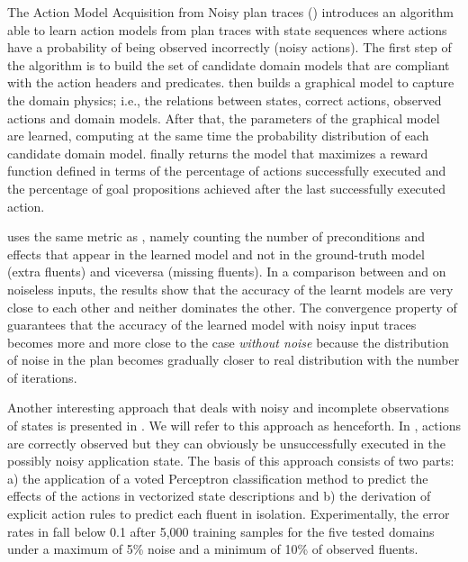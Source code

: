 The Action Model Acquisition from Noisy plan traces (\textbf{\AMAN}) \cite{zhuo2013action} introduces an algorithm able to learn action models from plan traces with \NO state sequences where actions have a probability of being observed incorrectly (noisy actions). The first step of the \AMAN algorithm is to build the set of candidate domain models that are compliant with the action headers and predicates. \AMAN then builds a graphical model to capture the domain physics; i.e., the relations between states, correct actions, observed actions and domain models. After that, the parameters of the graphical model are learned, computing at the same time the probability distribution of each candidate domain model. \AMAN finally returns the model that maximizes a reward function defined in terms of the percentage of actions successfully executed and the percentage of goal propositions achieved after the last successfully executed action.

\AMAN uses the same metric as \LAMP, namely counting the number of preconditions and effects that appear in the learned model and not in the ground-truth model (extra fluents) and viceversa (missing fluents). In a comparison between \AMAN and \ARMS on noiseless inputs, the results show that the accuracy of the learnt models are very close to each other and neither dominates the other. The convergence property of \AMAN guarantees that the accuracy of the learned model with noisy input traces becomes more and more close to the case  \emph{without noise} because the distribution of noise in the plan becomes gradually closer to real distribution with the number of iterations.


Another interesting approach that deals with noisy and incomplete observations of states is presented in \cite{MouraoZPS12}. We will refer to this approach as \textbf{\NOISTA} henceforth. In \NOISTA, actions are correctly observed but they can obviously be unsuccessfully executed in the possibly noisy application state. The basis of this approach consists of two parts: a) the application of a voted Perceptron classification method to predict the effects of the actions in vectorized state descriptions and b) the derivation of explicit \strips \texttt{} action rules to predict each fluent in isolation. Experimentally, the error rates in \NOISTA fall below 0.1 after 5,000 training samples for the five tested domains under a maximum of 5\% noise and a minimum of 10\% of observed fluents.


